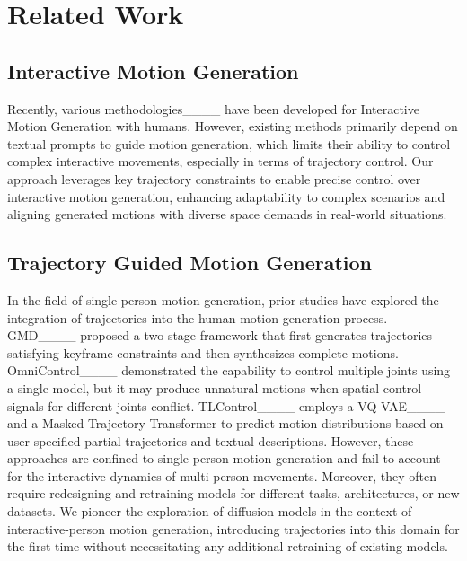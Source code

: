 \section{Related Work}
\subsection{Interactive Motion Generation}
Recently, various methodologies____ have been developed for Interactive Motion Generation with humans.
However, existing methods primarily depend on textual prompts to guide motion generation, which limits their ability to control complex interactive movements, especially in terms of trajectory control. 
Our approach leverages key trajectory constraints to enable precise control over interactive motion generation, enhancing adaptability to complex scenarios and aligning generated motions with diverse space demands in real-world situations.
\subsection{Trajectory Guided Motion Generation}
In the field of single-person motion generation, prior studies have explored the integration of trajectories into the human motion generation process.
GMD____ proposed a two-stage framework that first generates trajectories satisfying keyframe constraints and then synthesizes complete motions.
OmniControl____ demonstrated the capability to control multiple joints using a single model, but it may produce unnatural motions when spatial control signals for different joints conflict.
TLControl____ employs a VQ-VAE____ and a Masked Trajectory Transformer to predict motion distributions based on user-specified partial trajectories and textual descriptions.
However, these approaches are confined to single-person motion generation and fail to account for the interactive dynamics of multi-person movements.
Moreover, they often require redesigning and retraining models for different tasks, architectures, or new datasets.
We pioneer the exploration of diffusion models in the context of interactive-person motion generation, introducing trajectories into this domain for the first time without necessitating any additional retraining of existing models.